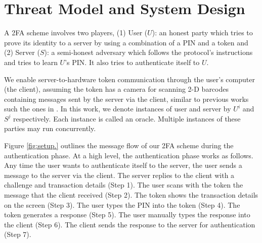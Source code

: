


\section{Threat Model and System Design}\label{sec::model}

A 2FA scheme involves two players, (1) {User ($U$)}: an honest party which tries to prove its identity to a server by using a combination of a PIN and a token and (2) {Server ($S$)}:  a semi-honest adversary which follows the protocol's instructions and tries to learn $U$'s PIN. It also tries to authenticate itself to $U$.  

We enable server-to-hardware token communication through the user's computer (the client), assuming the token has a camera for scanning 2-D barcodes containing messages sent by the server via the client, similar to previous works such the ones in \cite{JareckiJKSS21,Digipass-website,Gemalto}. 
%
%
In this work, we denote instances of user and server by  $U^{i}$ and  $S^{j}$ respectively. Each instance is called an oracle.  Multiple instances of these parties may run concurrently. %

Figure \ref{fig:setup.} outlines the message flow of our 2FA scheme during the authentication phase.  At a high level, the authentication phase works as follows. Any time the user wants to authenticate itself to the server, the user sends a message to the server via the client.  The server replies to the client with a challenge and transaction details (Step 1). The user scans with the token the message that the client received  (Step 2). The token shows the transaction details on the screen (Step 3). The user types the PIN into the token (Step 4). The token generates a response (Step 5). The user manually types the response into the client (Step 6).  The client sends the response to the server for authentication (Step 7). 




